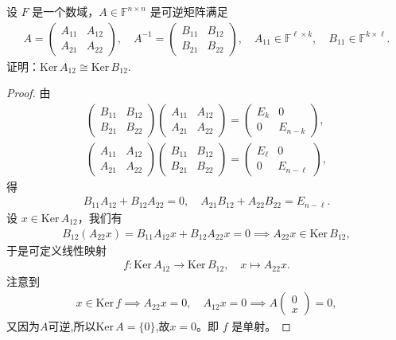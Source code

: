 \documentclass[../../main.tex]{subfiles}%
\begin{document}
\begin{example}
设 $F$ 是一个数域，$A \in \mathbb{F}^{n \times n}$ 是可逆矩阵满足
\begin{align*}
A = \begin{pmatrix} A_{11} & A_{12} \\ A_{21} & A_{22} \end{pmatrix}, \quad
A^{-1} = \begin{pmatrix} B_{11} & B_{12} \\ B_{21} & B_{22} \end{pmatrix}, \quad
A_{11} \in \mathbb{F}^{\ell \times k}, \quad B_{11} \in \mathbb{F}^{k \times \ell}.
\end{align*}
证明：$\text{Ker}\, A_{12} \cong \text{Ker}\, B_{12}$.
\end{example}
\begin{proof}
由
\begin{align*}
\begin{pmatrix} B_{11} & B_{12} \\ B_{21} & B_{22} \end{pmatrix}
\begin{pmatrix} A_{11} & A_{12} \\ A_{21} & A_{22} \end{pmatrix}
=
\begin{pmatrix} E_k & 0 \\ 0 & E_{n-k} \end{pmatrix}, \\
\begin{pmatrix} A_{11} & A_{12} \\ A_{21} & A_{22} \end{pmatrix}
\begin{pmatrix} B_{11} & B_{12} \\ B_{21} & B_{22} \end{pmatrix}
=
\begin{pmatrix} E_\ell & 0 \\ 0 & E_{n-\ell} \end{pmatrix},
\end{align*}
得
\begin{align*}
B_{11}A_{12} + B_{12}A_{22} = 0, \quad
A_{21}B_{12} + A_{22}B_{22} = E_{n-\ell}.
\end{align*}
设 $x \in \text{Ker}\, A_{12}$，我们有
\begin{align*}
B_{12}(A_{22}x) = B_{11}A_{12}x + B_{12}A_{22}x = 0 \implies A_{22}x \in \text{Ker}\, B_{12},
\end{align*}
于是可定义线性映射
\begin{align*}
f : \text{Ker}\, A_{12} \to \text{Ker}\, B_{12}, \quad x \mapsto A_{22}x.
\end{align*}
注意到
\begin{align*}
x \in \text{Ker}\, f \implies A_{22}x = 0, \quad A_{12}x = 0 \implies A\begin{pmatrix} 0 \\ x \end{pmatrix} = 0,
\end{align*}
又因为$A$可逆,所以$\text{Ker}\,A=\{0\}$,故$x = 0$。即 $f$ 是单射。


\end{proof}
\end{document}
